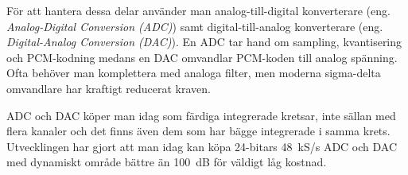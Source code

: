 För att hantera dessa delar använder man analog-till-digital konverterare
(eng. \emph{Analog-Digital Conversion (ADC)}) samt digital-till-analog
konverterare (eng. \emph{Digital-Analog Conversion (DAC)}). En ADC tar hand om
sampling, kvantisering och PCM-kodning medans en DAC omvandlar PCM-koden till
analog spänning. Ofta behöver man komplettera med analoga filter, men moderna
sigma-delta omvandlare har kraftigt reducerat kraven.

ADC och DAC köper man idag som färdiga integrerade kretsar, inte sällan med
flera kanaler och det finns även dem som har bägge integrerade i samma krets.
Utvecklingen har gjort att man idag kan köpa 24-bitars 48~kS/s ADC och DAC med
dynamiskt område bättre än 100~dB för väldigt låg kostnad.
